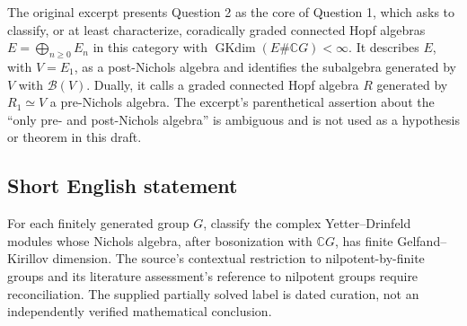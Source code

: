 \documentclass[11pt]{article}
\newcommand{\C}{\mathbb{C}}
\begin{document}
The original excerpt presents Question 2 as the core of Question 1, which asks to classify, or at least characterize, coradically graded connected Hopf algebras \(E=\bigoplus_{n\ge0}E_n\) in this category with \(\operatorname{GKdim}(E\#\C G)<\infty\). It describes \(E\), with \(V=E_1\), as a post-Nichols algebra and identifies the subalgebra generated by \(V\) with \(\mathcal B(V)\). Dually, it calls a graded connected Hopf algebra \(R\) generated by \(R_1\simeq V\) a pre-Nichols algebra. The excerpt's parenthetical assertion about the ``only pre- and post-Nichols algebra'' is ambiguous and is not used as a hypothesis or theorem in this draft.
\subsection{Short English statement}
For each finitely generated group \(G\), classify the complex Yetter--Drinfeld modules whose Nichols algebra, after bosonization with \(\C G\), has finite Gelfand--Kirillov dimension. The source's contextual restriction to nilpotent-by-finite groups and its literature assessment's reference to nilpotent groups require reconciliation. The supplied partially solved label is dated curation, not an independently verified mathematical conclusion.
\end{document}
